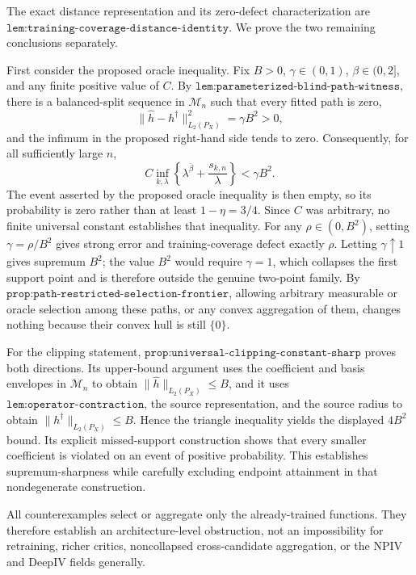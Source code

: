 The exact distance representation and its zero-defect characterization are \(\texttt{lem:training-coverage-distance-identity}\). We prove the two remaining conclusions separately.

First consider the proposed oracle inequality. Fix \(B>0\), \(\gamma\in(0,1)\), \(\beta\in(0,2]\), and any finite positive value of \(C\). By \(\texttt{lem:parameterized-blind-path-witness}\), there is a balanced-split sequence in \(\mathcal M_n\) such that every fitted path is zero,
\[
 \|\widehat h-h^\dagger\|_{L_2(P_X)}^2=\gamma B^2>0,
\]
and the infimum in the proposed right-hand side tends to zero. Consequently, for all sufficiently large \(n\),
\[
 C\inf_{k,\lambda}
 \left\{\lambda^{\bar\beta}+\frac{s_{k,n}}{\lambda}\right\}
 <\gamma B^2.
\]
The event asserted by the proposed oracle inequality is then empty, so its probability is zero rather than at least \(1-\eta=3/4\). Since \(C\) was arbitrary, no finite universal constant establishes that inequality. For any \(\rho\in(0,B^2)\), setting \(\gamma=\rho/B^2\) gives strong error and training-coverage defect exactly \(\rho\). Letting \(\gamma\uparrow1\) gives supremum \(B^2\); the value \(B^2\) would require \(\gamma=1\), which collapses the first support point and is therefore outside the genuine two-point family. By \(\texttt{prop:path-restricted-selection-frontier}\), allowing arbitrary measurable or oracle selection among these paths, or any convex aggregation of them, changes nothing because their convex hull is still \(\{0\}\).

For the clipping statement, \(\texttt{prop:universal-clipping-constant-sharp}\) proves both directions. Its upper-bound argument uses the coefficient and basis envelopes in \(\mathcal M_n\) to obtain \(\|\widehat h\|_{L_2(P_X)}\le B\), and it uses \(\texttt{lem:operator-contraction}\), the source representation, and the source radius to obtain \(\|h^\dagger\|_{L_2(P_X)}\le B\). Hence the triangle inequality yields the displayed \(4B^2\) bound. Its explicit missed-support construction shows that every smaller coefficient is violated on an event of positive probability. This establishes supremum-sharpness while carefully excluding endpoint attainment in that nondegenerate construction.

All counterexamples select or aggregate only the already-trained functions. They therefore establish an architecture-level obstruction, not an impossibility for retraining, richer critics, noncollapsed cross-candidate aggregation, or the NPIV and DeepIV fields generally.